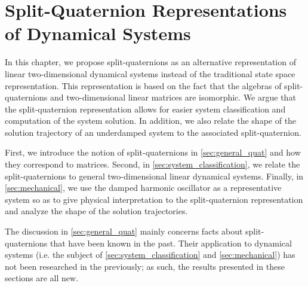 \chapter{Split-Quaternion Representations of Dynamical Systems}
\label{chap:quaternion}
In this chapter, we propose split-quaternions as an alternative representation of linear two-dimensional dynamical systems instead of the traditional state space representation. This representation is based on the fact that the algebras of split-quaternions and two-dimensional linear matrices are isomorphic. We argue that the split-quaternion representation allows for easier system classification and computation of the system solution. In addition, we also relate the shape of the solution trajectory of an underdamped system to the associated split-quaternion.

First, we introduce the notion of split-quaternions in \cref{sec:general_quat} and how they correspond to matrices. Second, in \cref{sec:system_classification}, we relate the split-quaternions to general two-dimensional linear dynamical systems. Finally, in \cref{sec:mechanical}, we use the damped harmonic oscillator as a representative system so as to give physical interpretation to the split-quaternion representation and analyze the shape of the solution trajectories. 

The discussion in \cref{sec:general_quat} mainly concerns facts about split-quaternions that have been known in the past. Their application to dynamical systems (i.e. the subject of \cref{sec:system_classification} and \cref{sec:mechanical}) has not been researched in the previously; as such, the results presented in these sections are all new.






